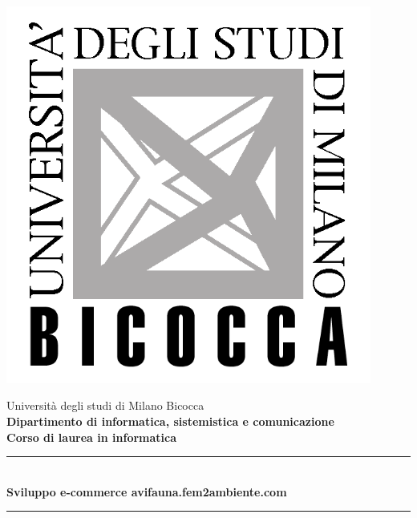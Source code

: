 
\begin{titlepage}

\begin{minipage}[c][0cm][t]{0.30\linewidth}
	\includegraphics[width=0.9\textwidth]{./images/logo-bicocca.jpg}
\end{minipage}

\hfill
\begin{minipage}[c][6cm][t]{0.67\linewidth}
	\vspace*{1cm}
	\begin{center}
		{\Large Università degli studi di Milano Bicocca} \\[0.5cm]
		{\Large \bfseries Dipartimento di informatica, sistemistica e comunicazione} \\[0.5cm]
		{\Large \bfseries Corso di laurea in informatica}
	\end{center}
\end{minipage}

\begin{center}
	\vspace*{3cm}
	\rule{\linewidth}{0.5mm} \\[0.4cm]
	{ \huge \bfseries Sviluppo e-commerce avifauna.fem2ambiente.com} \\[0.1cm]
	\rule{\linewidth}{0.5mm} \\[1.5cm]
\end{center}


\end{titlepage}
